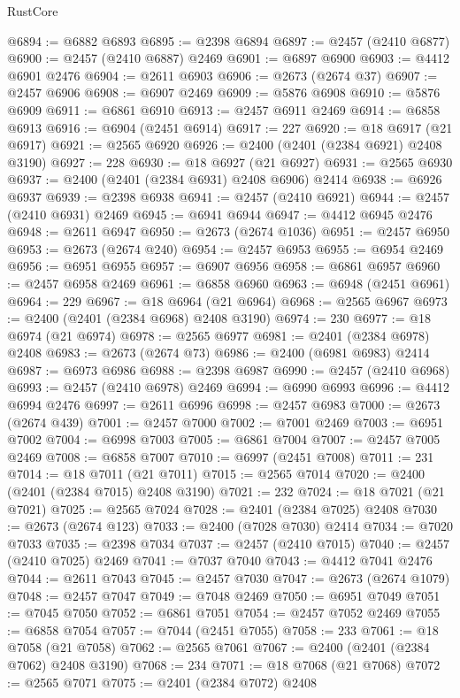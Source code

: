 \begin{lexlean}{RustCore}
\begin{coremodule}
@6894 := @6882 @6893
@6895 := @2398 @6894
@6897 := @2457 (@2410 @6877)
@6900 := @2457 (@2410 @6887) @2469
@6901 := @6897 @6900
@6903 := @4412 @6901 @2476
@6904 := @2611 @6903
@6906 := @2673 (@2674 @37)
@6907 := @2457 @6906
@6908 := @6907 @2469
@6909 := @5876 @6908
@6910 := @5876 @6909
@6911 := @6861 @6910
@6913 := @2457 @6911 @2469
@6914 := @6858 @6913
@6916 := @6904 (@2451 @6914)
@6917 := 227
@6920 := @18 @6917 (@21 @6917)
@6921 := @2565 @6920
@6926 := @2400 (@2401 (@2384 @6921) @2408 @3190)
@6927 := 228
@6930 := @18 @6927 (@21 @6927)
@6931 := @2565 @6930
@6937 := @2400 (@2401 (@2384 @6931) @2408 @6906) @2414
@6938 := @6926 @6937
@6939 := @2398 @6938
@6941 := @2457 (@2410 @6921)
@6944 := @2457 (@2410 @6931) @2469
@6945 := @6941 @6944
@6947 := @4412 @6945 @2476
@6948 := @2611 @6947
@6950 := @2673 (@2674 @1036)
@6951 := @2457 @6950
@6953 := @2673 (@2674 @240)
@6954 := @2457 @6953
@6955 := @6954 @2469
@6956 := @6951 @6955
@6957 := @6907 @6956
@6958 := @6861 @6957
@6960 := @2457 @6958 @2469
@6961 := @6858 @6960
@6963 := @6948 (@2451 @6961)
@6964 := 229
@6967 := @18 @6964 (@21 @6964)
@6968 := @2565 @6967
@6973 := @2400 (@2401 (@2384 @6968) @2408 @3190)
@6974 := 230
@6977 := @18 @6974 (@21 @6974)
@6978 := @2565 @6977
@6981 := @2401 (@2384 @6978) @2408
@6983 := @2673 (@2674 @73)
@6986 := @2400 (@6981 @6983) @2414
@6987 := @6973 @6986
@6988 := @2398 @6987
@6990 := @2457 (@2410 @6968)
@6993 := @2457 (@2410 @6978) @2469
@6994 := @6990 @6993
@6996 := @4412 @6994 @2476
@6997 := @2611 @6996
@6998 := @2457 @6983
@7000 := @2673 (@2674 @439)
@7001 := @2457 @7000
@7002 := @7001 @2469
@7003 := @6951 @7002
@7004 := @6998 @7003
@7005 := @6861 @7004
@7007 := @2457 @7005 @2469
@7008 := @6858 @7007
@7010 := @6997 (@2451 @7008)
@7011 := 231
@7014 := @18 @7011 (@21 @7011)
@7015 := @2565 @7014
@7020 := @2400 (@2401 (@2384 @7015) @2408 @3190)
@7021 := 232
@7024 := @18 @7021 (@21 @7021)
@7025 := @2565 @7024
@7028 := @2401 (@2384 @7025) @2408
@7030 := @2673 (@2674 @123)
@7033 := @2400 (@7028 @7030) @2414
@7034 := @7020 @7033
@7035 := @2398 @7034
@7037 := @2457 (@2410 @7015)
@7040 := @2457 (@2410 @7025) @2469
@7041 := @7037 @7040
@7043 := @4412 @7041 @2476
@7044 := @2611 @7043
@7045 := @2457 @7030
@7047 := @2673 (@2674 @1079)
@7048 := @2457 @7047
@7049 := @7048 @2469
@7050 := @6951 @7049
@7051 := @7045 @7050
@7052 := @6861 @7051
@7054 := @2457 @7052 @2469
@7055 := @6858 @7054
@7057 := @7044 (@2451 @7055)
@7058 := 233
@7061 := @18 @7058 (@21 @7058)
@7062 := @2565 @7061
@7067 := @2400 (@2401 (@2384 @7062) @2408 @3190)
@7068 := 234
@7071 := @18 @7068 (@21 @7068)
@7072 := @2565 @7071
@7075 := @2401 (@2384 @7072) @2408

\end{coremodule}
\end{lexlean}
